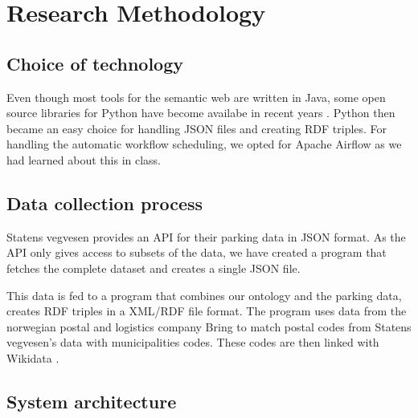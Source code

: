 \chapter{Research Methodology}

\section{Choice of technology}
Even though most tools for the semantic web are written in Java, some open source libraries for Python have become availabe in recent years \cite{w3java}. Python then became an easy choice for handling JSON files and creating RDF triples. For handling the automatic workflow scheduling, we opted for Apache Airflow as we had learned about this in class.


\section{Data collection process}
Statens vegvesen \cite{statensvegvesen} provides an API for their parking data in JSON format. As the API only gives access to subsets of the data, we have created a program that fetches the complete dataset and creates a single JSON file.

This data is fed to a program that combines our ontology and the parking data, creates RDF triples in a XML/RDF file format. The program uses data from the norwegian postal and logistics company Bring \cite{bring} to match postal codes from Statens vegvesen's data with municipalities codes. These codes are then linked with Wikidata \cite{wikidata}.


\section{System architecture}



